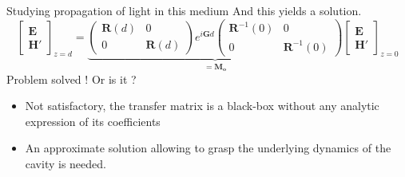 \documentclass[aspectratio=169]{beamer}
\begin{document}
\begin{frame}{Studying propagation of light in this medium}
	And this yields a solution.
	\begin{equation*}
	\begin{bmatrix}
	\bm{E}\\\bm{H}'
	\end{bmatrix}_{z=d} = \underbrace{\begin{pmatrix}
		\bm{R}(d) & 0\\0 & \bm{R}(d)
		\end{pmatrix}e^{i\bm{G}d}\begin{pmatrix}
		\bm{R}^{-1}(0) & 0\\0 & \bm{R}^{-1}(0)
		\end{pmatrix}}_{=\bm{M_o}}\begin{bmatrix}
	\bm{E}\\\bm{H}'
	\end{bmatrix}_{z=0}
	\end{equation*}
	Problem solved !
	\pause
	\alert{Or is it ?}
	\begin{itemize}
		\item<3-> Not satisfactory, the transfer matrix is a black-box without any analytic expression of its coefficients
		\item<4-> An approximate solution allowing to grasp the underlying dynamics of the cavity is needed.
	\end{itemize}
\end{frame}
\end{document}
